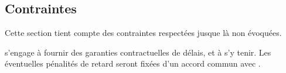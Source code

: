 \subsection{Contraintes}
Cette section tient compte des contraintes respectées jusque là non évoquées.

\begin{constraint}
\amo s'engage à fournir des garanties contractuelles de délais, et à s'y tenir. Les éventuelles pénalités de retard seront fixées d'un accord commun avec \mo.
\end{constraint}
